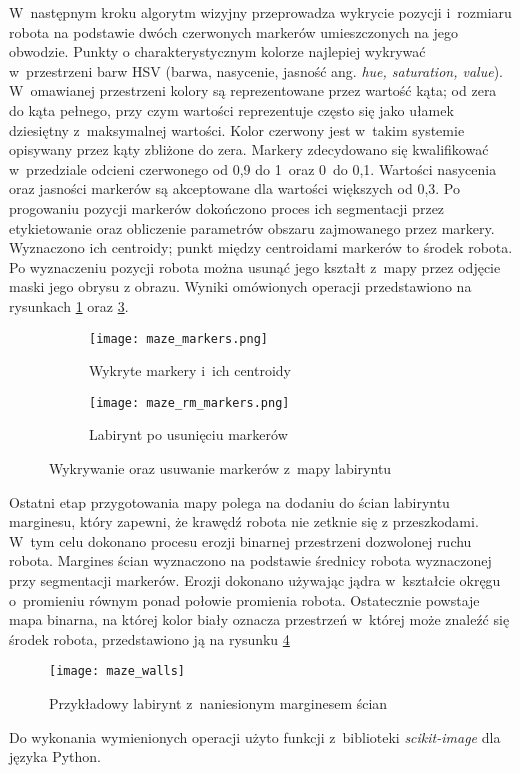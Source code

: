 W~następnym kroku algorytm wizyjny przeprowadza wykrycie pozycji i~rozmiaru
robota na podstawie dwóch czerwonych markerów umieszczonych na jego obwodzie.
Punkty o charakterystycznym kolorze najlepiej wykrywać w~przestrzeni barw HSV
(barwa, nasycenie, jasność ang. \textit{hue, saturation, value}).
W~omawianej przestrzeni kolory są reprezentowane przez wartość kąta; od zera do
kąta pełnego, przy czym wartości reprezentuje często się jako ułamek dziesiętny
z~maksymalnej wartości.
Kolor czerwony jest w~takim systemie opisywany przez kąty zbliżone do zera.
Markery zdecydowano się kwalifikować w~przedziale odcieni czerwonego od 0,9 do
1~oraz 0~do 0,1.
Wartości nasycenia oraz jasności markerów są akceptowane dla wartości większych
od 0,3.
Po progowaniu pozycji markerów dokończono proces ich segmentacji przez
etykietowanie oraz obliczenie parametrów obszaru zajmowanego przez markery.
Wyznaczono ich centroidy; punkt między centroidami markerów to środek robota.
Po wyznaczeniu pozycji robota można usunąć jego kształt z~mapy przez odjęcie
maski jego obrysu z obrazu.
Wyniki omówionych operacji przedstawiono na rysunkach \ref{fig:maze_markers}
oraz \ref{fig:maze_rm_markers}.
\begin{figure}
\centering
\hfill
\begin{subfigure}[b]{0.45\textwidth}
	\centering
	\texttt{[image: maze\_markers.png]}
	\caption{Wykryte markery i~ich centroidy}
	\label{fig:maze_markers}
\end{subfigure}
\hfill
\begin{subfigure}[b]{0.45\textwidth}
	\centering
	\texttt{[image: maze\_rm\_markers.png]}	
	\caption{Labirynt po usunięciu markerów}
	\label{fig:maze_rm_markers}
\end{subfigure}
\hfill
\caption{Wykrywanie oraz usuwanie markerów z~mapy labiryntu}
\end{figure}

Ostatni etap przygotowania mapy polega na dodaniu do ścian labiryntu marginesu,
który zapewni, że krawędź robota nie zetknie się z przeszkodami.
W~tym celu dokonano procesu erozji binarnej przestrzeni dozwolonej ruchu
robota.
Margines ścian wyznaczono na podstawie średnicy robota wyznaczonej przy
segmentacji markerów.
Erozji dokonano używając jądra w~kształcie okręgu o~promieniu równym ponad
połowie promienia robota.
Ostatecznie powstaje mapa binarna, na której kolor biały oznacza przestrzeń
w~której może znaleźć się środek robota, przedstawiono ją na rysunku
\ref{fig:maze_walls}
\begin{figure}
\centering
\texttt{[image: maze\_walls]}
\caption{Przykładowy labirynt z~naniesionym marginesem ścian}
\label{fig:maze_walls}
\end{figure}

Do wykonania wymienionych operacji użyto funkcji z~biblioteki
\textit{scikit-image} dla języka Python.
